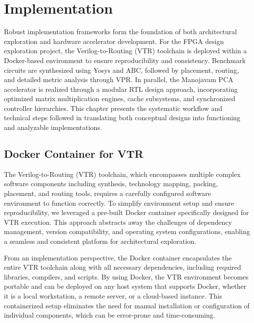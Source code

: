 \chapter{Implementation}
Robust implementation frameworks form the foundation of both architectural exploration and hardware accelerator development. For the FPGA design exploration project, the Verilog-to-Routing (VTR) toolchain is deployed within a Docker-based environment to ensure reproducibility and consistency. Benchmark circuits are synthesized using Yosys and ABC, followed by placement, routing, and detailed metric analysis through VPR. In parallel, the Manojavam PCA accelerator is realized through a modular RTL design approach, incorporating optimized matrix multiplication engines, cache subsystems, and synchronized controller hierarchies. This chapter presents the systematic workflow and technical steps followed in translating both conceptual designs into functioning and analyzable implementations.

\begin{comment}
\indent\indent From Chapter 2 onwards, every chapter should start with an introduction paragraph. This paragraph should brief about the flow of the chapter. This introduction can be limited within 4 to 5 sentences. The chapter heading should be appropriately modified (a sample heading is shown for this chapter).But don't start the introduction paragraph in the chapters 2 to end with "This chapter deals with....". Instead you should bring in the highlights of the chapter in the introduction paragraph. 
\end{comment}

\section{Docker Container for VTR}
The Verilog-to-Routing (VTR) toolchain, which encompasses multiple complex software components including synthesis, technology mapping, packing, placement, and routing tools, requires a carefully configured software environment to function correctly. To simplify environment setup and ensure reproducibility, we leveraged a pre-built Docker container specifically designed for VTR execution. This approach abstracts away the challenges of dependency management, version compatibility, and operating system configurations, enabling a seamless and consistent platform for architectural exploration.

From an implementation perspective, the Docker container encapsulates the entire VTR toolchain along with all necessary dependencies, including required libraries, compilers, and scripts. By using Docker, the VTR environment becomes portable and can be deployed on any host system that supports Docker, whether it is a local workstation, a remote server, or a cloud-based instance. This containerized setup eliminates the need for manual installation or configuration of individual components, which can be error-prone and time-consuming.

